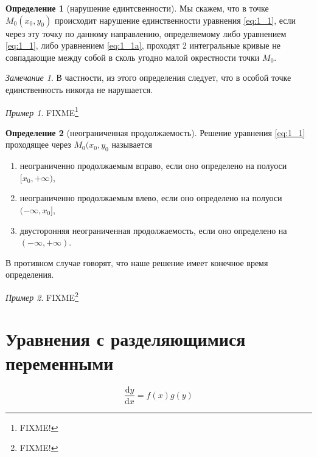 \documentclass[a4paper,10pt]{report}
\newcommand{\ud}{\mathrm{d}}
\theoremstyle{definition}
\newtheorem{definition}{Определение}[section]
\theoremstyle{remark}
\newtheorem{note}{Замечание}[section]
\newtheorem{example}{Пример}[section]
\theoremstyle{plain}
\begin{document}
\begin{definition}[нарушение единтсвенности]
 Мы скажем, что в точке $M_0(x_0,y_0)$ происходит нарушение единственности уравнения \eqref{eq:1_1}, если через эту точку по данному направлению, определяемому либо уравнением \eqref{eq:1_1}, либо уравнением \eqref{eq:1_1a}, проходят 2 интегральные кривые не совпадающие между собой в сколь угодно малой окрестности точки $M_0$.
\end{definition}

\begin{note}
 В частности, из этого определения следует, что в особой точке единственность никогда не нарушается.
\end{note}

\begin{example}
 FIXME\footnote{FIXME!}
\end{example}

\begin{definition}[неограниченная продолжаемость]
 Решение уравнения \eqref{eq:1_1} проходящее через $M_0(x_0,y_0$ называется
 \begin{enumerate}
  \item неограниченно продолжаемым вправо, если оно определено на полуоси $[x_0, +\infty)$,
  \item неограниченно продолжаемым влево, если оно определено на полуоси $(-\infty, x_0]$,
  \item двусторонняя неограниченная продолжаемость, если оно определено на $(-\infty, +\infty)$.
 \end{enumerate}
 В противном случае говорят, что наше решение имеет конечное время определения.
\end{definition}

\begin{example}
 FIXME\footnote{FIXME!}
\end{example}

\section{Уравнения с разделяющимися переменными}
\begin{equation*}
 \frac{\ud y}{\ud x} = f(x) g(y)
\end{equation*}
\end{document}
